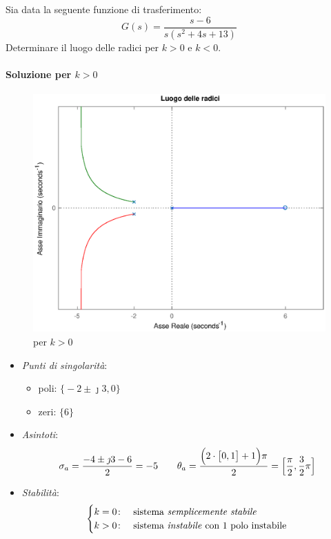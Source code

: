 \exercise{}
Sia data la seguente funzione di trasferimento:
\[
	G(s) = \frac{s-6}{s(s^2+4s+13)}
\]
Determinare il luogo delle radici per \(k>0\) e \(k<0\).

\paragraph{Soluzione per \(k>0\)}

\begin{figure}[ht]
	\centering
	\includegraphics[scale=.5]{mod1/assets/rl_ex313}
	\caption{per \(k>0\)}
\end{figure}

\begin{itemize}
	\item \emph{Punti di singolarità}:
		\begin{itemize}
			\item poli: \(\bigl\{-2\pm\jmath3,0\bigr\}\)
			\item zeri: \(\bigl\{6\bigr\}\)
		\end{itemize}
	\item \emph{Asintoti}:
		\[
			\sigma_a = \frac{-4\pm\jmath3-6}{2} = -5 \qquad
			\theta_a = \frac{\Bigl(2\cdot\bigl[0,1\bigr]+1\Bigr)\pi}{2} = \Bigl[\frac{\pi}{2},\frac{3}{2}\pi\Bigr]
		\]
	\item \emph{Stabilità}:
		\[\begin{cases}
			k=0\colon & \text{sistema \emph{semplicemente stabile}} \\
			k>0\colon & \text{sistema \emph{instabile} con 1 polo instabile}
		\end{cases}\]
\end{itemize}

